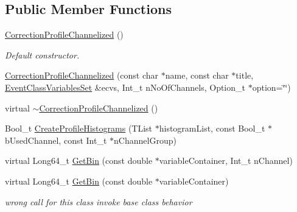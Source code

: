 \subsection*{Public Member Functions}
\begin{DoxyCompactItemize}
\item 
\mbox{\label{classQn_1_1CorrectionProfileChannelized_a82745b91a442b1999b166dadf312b47d}} 
\mbox{\hyperlink{classQn_1_1CorrectionProfileChannelized_a82745b91a442b1999b166dadf312b47d}{Correction\+Profile\+Channelized}} ()
\begin{DoxyCompactList}\small\item\em Default constructor. \end{DoxyCompactList}\item 
\mbox{\hyperlink{classQn_1_1CorrectionProfileChannelized_ad3860853ae13c35e17017767005cda92}{Correction\+Profile\+Channelized}} (const char $\ast$name, const char $\ast$title, \mbox{\hyperlink{classQn_1_1EventClassVariablesSet}{Event\+Class\+Variables\+Set}} \&ecvs, Int\+\_\+t n\+No\+Of\+Channels, Option\+\_\+t $\ast$option=\char`\"{}\char`\"{})
\item 
virtual \mbox{\hyperlink{classQn_1_1CorrectionProfileChannelized_a5389dfe26fc02d4efd276ae5b9dcd7b8}{$\sim$\+Correction\+Profile\+Channelized}} ()
\item 
Bool\+\_\+t \mbox{\hyperlink{classQn_1_1CorrectionProfileChannelized_ad98e4ab64dbbc306de3b67eee35a1425}{Create\+Profile\+Histograms}} (T\+List $\ast$histogram\+List, const Bool\+\_\+t $\ast$b\+Used\+Channel, const Int\+\_\+t $\ast$n\+Channel\+Group)
\item 
virtual Long64\+\_\+t \mbox{\hyperlink{classQn_1_1CorrectionProfileChannelized_a10eb9b98a847afecf08e01e4e82bd4c5}{Get\+Bin}} (const double $\ast$variable\+Container, Int\+\_\+t n\+Channel)
\item 
\mbox{\label{classQn_1_1CorrectionProfileChannelized_aa495dacf1deb21e799a08afbefd323a3}} 
virtual Long64\+\_\+t \mbox{\hyperlink{classQn_1_1CorrectionProfileChannelized_aa495dacf1deb21e799a08afbefd323a3}{Get\+Bin}} (const double $\ast$variable\+Container)
\begin{DoxyCompactList}\small\item\em wrong call for this class invoke base class behavior \end{DoxyCompactList}\item 

\end{DoxyCompactItemize}
